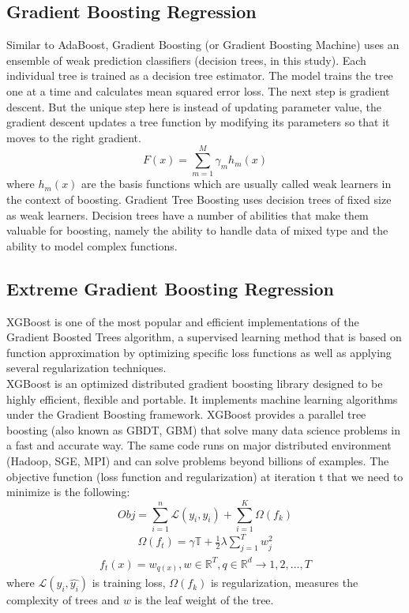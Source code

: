 \documentclass[12pt,a4paper]{report}
\begin{document}
\subsection{Gradient Boosting Regression}
Similar to AdaBoost, Gradient Boosting (or Gradient Boosting Machine) uses an ensemble of weak prediction classifiers (decision trees, in this study). Each individual tree is trained as a decision tree estimator. The model trains the tree one at a time and calculates mean squared error loss. The next step is gradient descent. But the unique step here is instead of updating parameter value, the gradient descent updates a tree function by modifying its parameters so that it moves to the right gradient\cite{Gradient}.
\begin{equation}
F(x) = \sum_{m=1}^{M} \gamma_{m} h_{m}(x)
\end{equation}
where $h_{m}(x)$ are the basis functions which are usually called weak learners in the context of boosting. Gradient Tree Boosting uses decision trees of fixed size as weak learners. Decision trees have a number of abilities that make them valuable for boosting, namely the ability to handle data of mixed type and the ability to model complex functions.\cite{sklearn}

\subsection{Extreme Gradient Boosting Regression}
XGBoost is one of the most popular and efficient implementations of the Gradient Boosted Trees algorithm, a supervised learning method that is based on function approximation by optimizing specific loss functions as well as applying several regularization techniques.\\
XGBoost is an optimized distributed gradient boosting library designed to be highly efficient, flexible and portable. It implements machine learning algorithms under the Gradient Boosting framework. XGBoost provides a parallel tree boosting (also known as GBDT, GBM) that solve many data science problems in a fast and accurate way. The same code runs on major distributed environment (Hadoop, SGE, MPI) and can solve problems beyond billions of examples.\cite{xgboost}
The objective function (loss function and regularization) at iteration t that we need to minimize is the following:
\begin{equation}
Obj = \sum_{i=1}^{n} \mathcal{L}(y_{i}, \hat{y_{i}}) +\sum_{i=1}^{K}\Omega (f_{k})
\end{equation}
\begin{align*}
\Omega(f_{t}) = \gamma \mathbb{T} +\frac{1}{2}\lambda \sum_{j=1}^{T}w_{j}^{2}
\end{align*}
\begin{align*}
f_{t}(x) = w_{q(x)}, w \in \mathbb{R}^{T}, q\in \mathbb{R}^{d} \rightarrow {1,2,\ldots,T}
\end{align*}
where $\mathcal{L}(y_{i}, \hat{y_{i}})$ is training loss, $\Omega (f_{k})$ is regularization, measures the complexity of trees and $w$ is the leaf weight of the tree.
\end{document}

